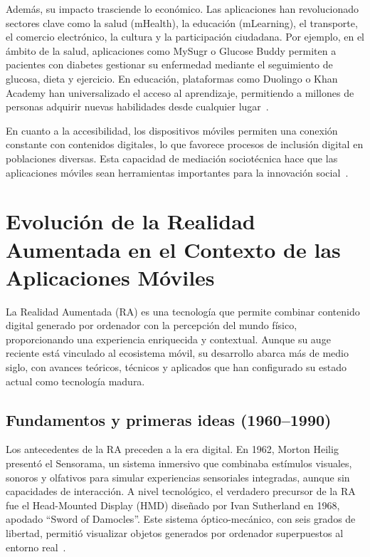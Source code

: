 Además, su impacto trasciende lo económico. Las aplicaciones han revolucionado sectores clave como la salud (mHealth), la educación (mLearning), el transporte, el comercio electrónico, la cultura y la participación ciudadana. Por ejemplo, en el ámbito de la salud, aplicaciones como MySugr o Glucose Buddy permiten a pacientes con diabetes gestionar su enfermedad mediante el seguimiento de glucosa, dieta y ejercicio. En educación, plataformas como Duolingo o Khan Academy han universalizado el acceso al aprendizaje, permitiendo a millones de personas adquirir nuevas habilidades desde cualquier lugar~\cite{parsons2020}.

En cuanto a la accesibilidad, los dispositivos móviles permiten una conexión constante con contenidos digitales, lo que favorece procesos de inclusión digital en poblaciones diversas. Esta capacidad de mediación sociotécnica hace que las aplicaciones móviles sean herramientas importantes para la innovación social~\cite{parsons2020}.



\section{Evolución de la Realidad Aumentada en el Contexto de las Aplicaciones Móviles}

La Realidad Aumentada (RA) es una tecnología que permite combinar contenido digital generado por ordenador con la percepción del mundo físico, proporcionando una experiencia enriquecida y contextual. Aunque su auge reciente está vinculado al ecosistema móvil, su desarrollo abarca más de medio siglo, con avances teóricos, técnicos y aplicados que han configurado su estado actual como tecnología madura.

\subsection{Fundamentos y primeras ideas (1960–1990)}
Los antecedentes de la RA preceden a la era digital. En 1962, Morton Heilig presentó el Sensorama, un sistema inmersivo que combinaba estímulos visuales, sonoros y olfativos para simular experiencias sensoriales integradas, aunque sin capacidades de interacción. A nivel tecnológico, el verdadero precursor de la RA fue el Head-Mounted Display (HMD) diseñado por Ivan Sutherland en 1968, apodado “Sword of Damocles”. Este sistema óptico-mecánico, con seis grados de libertad, permitió visualizar objetos generados por ordenador superpuestos al entorno real~\cite{azuma1997}.


